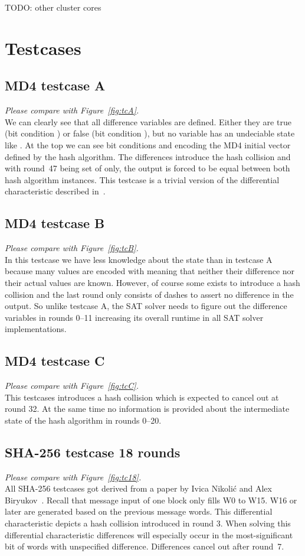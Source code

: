 \begin{appendices}
TODO: other cluster cores


\chapter{Testcases}
\label{app:tc}
%
\newcommand\cmp[1]{\emph{Please compare with Figure~\ref{fig:#1}.} \\ }
%
\section{MD4 testcase A}
\label{sec:tcA}
\cmp{tcA}
We can clearly see that all difference variables are defined.
Either they are true (bit condition {\dnCx}) or false (bit condition {\dnCh}),
but no variable has an undeciable state like {\dnCq}. At the top we can see
bit conditions {\dnCz} and {\dnCo} encoding the MD4 initial vector defined
by the hash algorithm. The differences {\dnCx} introduce the hash collision
and with round~47 being set of {\dnCh} only, the output is forced to be
equal between both hash algorithm instances. This testcase
is a trivial version of the differential characteristic described
in~\cite{sasaki2007new}.

\section{MD4 testcase B}
\label{sec:tcB}
\cmp{tcB}
In this testcase we have less knowledge about the state than in testcase A
because many values are encoded with {\dnCq} meaning that neither their
difference nor their actual values are known.
However, of course some {\dnCx} exists to introduce a hash collision
and the last round only consists of dashes to assert no difference
in the output.
So unlike testcase A, the SAT solver needs to figure out the difference
variables in rounds 0--11 increasing its overall runtime in all SAT solver
implementations.

\section{MD4 testcase C}
\label{sec:tcC}
\cmp{tcC}
This testcases introduces a hash collision which is expected to cancel out
at round 32. At the same time no information is provided about the intermediate
state of the hash algorithm in rounds 0--20.

\section{SHA-256 testcase 18 rounds}
\label{sec:tc18}
\cmp{tc18}
All SHA-256 testcases got derived from a paper by Ivica Nikolić and Alex Biryukov~\cite{nikolic2008collisions}.
Recall that message input of one block only fills W0 to W15. W16 or later
are generated based on the previous message words. This differential characteristic
depicts a hash collision introduced in round 3. When solving this differential characteristic
differences will especially occur in the most-significant bit of words with unspecified
difference. Differences cancel out after round~7.


\end{appendices}
